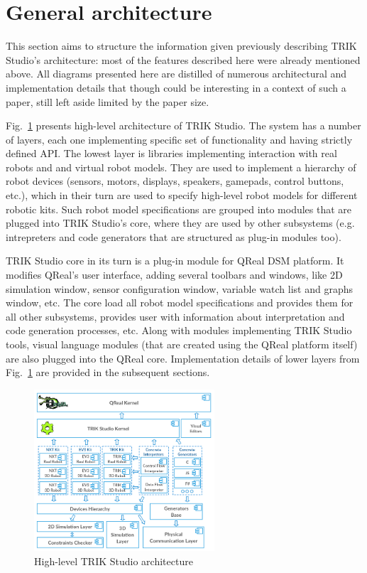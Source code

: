 \documentclass[conference]{IEEEtran}
\begin{document}
\section{General architecture}
\label{chapter:commonArchitecture}

This section aims to structure the information given previously describing TRIK Studio's architecture: most of the features described here were already mentioned above. All diagrams presented here are distilled of numerous architectural and implementation details that though could be interesting in a context of such a paper, still left aside limited by the paper size.

Fig.~\ref{image:commonTSArch} presents high-level architecture of TRIK Studio. The system has a number of layers, each one implementing specific set of functionality and having strictly defined API. The lowest layer is libraries implementing interaction with real robots and and virtual robot models. They are used to implement a hierarchy of robot devices (sensors, motors, displays, speakers, gamepads, control buttons, etc.), which in their turn are used to specify high-level robot models for different robotic kits. Such robot model specifications are grouped into modules that are plugged into TRIK Studio's core, where they are used by other subsystems (e.g. intrepreters and code generators that are structured as plug-in modules too).

TRIK Studio core in its turn is a plug-in module for QReal DSM platform. It modifies QReal's user interface, adding several toolbars and windows, like 2D simulation window, sensor configuration window, variable watch list and graphs window, etc. The core load all robot model specifications and provides them for all other subsystems, provides user with information about interpretation and code generation processes, etc. Along with modules implementing TRIK Studio tools, visual language modules (that are created using the QReal platform itself) are also plugged into the QReal core. Implementation details of lower layers from Fig.~\ref{image:commonTSArch} are provided in the subsequent sections.

\begin{figure}[ht]
    \centering
    \includegraphics[width=0.6\textwidth]{TS_Common_Architecture.png}
    \caption{High-level TRIK Studio architecture}
    \label{image:commonTSArch}
\end{figure}
\end{document}

